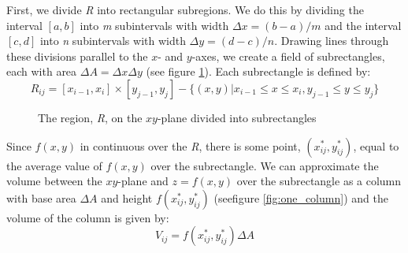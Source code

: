 First, we divide \textit{R} into rectangular subregions. We do this by 
dividing the interval $[a, b]$ into \textit{m} subintervals with width $\Delta 
x = (b - a)/m$ and the interval $[c, d]$ into \textit{n} subintervals with 
width $\Delta y = (d - c) / n$. Drawing lines through these divisions parallel 
to the $x$- and $y$-axes, we create a field of subrectangles, each with area 
$\Delta A = \Delta x \Delta y$ (see figure \ref{fig:subrectangles}). Each 
subrectangle is defined by:
$$\textit{R}_{ij} = [x_{i - 1}, x_i] \times [y_{j - 1}, y_j] - \{ (x, y) | x_{
i - 1} \leq x \leq x_i, y_{j - 1} \leq y \leq y_j \}$$ 

\begin{figure}[htbp]
    \centering
    \caption{The region, \textit{R}, on the $xy$-plane divided into 
    subrectangles}
    \label{fig:subrectangles}
\end{figure}

Since $f(x,y)$ in continuous over the \textit{R}, there is some point, $(x_{ij}
^*, y_{ij}^*)$, equal to the average value of $f(x,y)$ over the subrectangle. 
We can approximate the volume between the $xy$-plane and $z = f(x,y)$ over
the subrectangle as a column with base area $\Delta A$ and height $f(x_{ij}^*, 
y_{ij}^*)$ (seefigure \ref{fig:one_column}) and the volume of the column is 
given by:
$$V_{ij} = f(x_{ij}^*, y_{ij}^*) \Delta A$$

